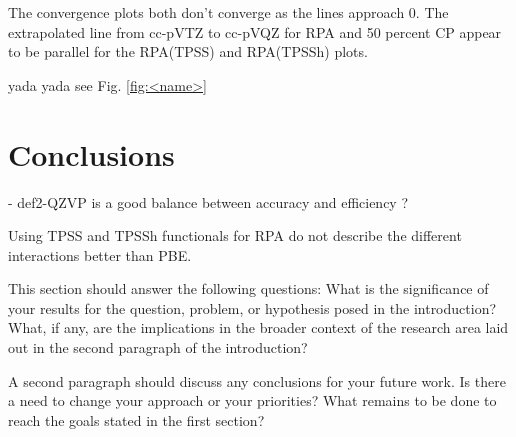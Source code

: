 \documentclass[11pt]{article}
\newcommand{\brian}[1]{{\color{orange} #1}}
\begin{document}
The convergence plots both don't converge as the lines approach 0. The
extrapolated line from cc-pVTZ to cc-pVQZ for RPA and 50 percent CP
appear to be parallel for the RPA(TPSS) and RPA(TPSSh) plots.

\brian{yada yada see Fig. \ref{fig:<name>}}




\section{Conclusions}

- def2-QZVP is a good balance between accuracy and efficiency ?

Using TPSS and TPSSh functionals for RPA do not describe the different
interactions better than PBE.


This section should answer the following questions:
What is the significance of your results for the question, problem, or
hypothesis posed in the introduction? What, if any, are the
implications in the broader context of the research area laid out in the
second paragraph of the introduction? 

A second paragraph should discuss any conclusions for your future work. 
Is there a need to change your approach or your priorities? What remains
to be done to reach the goals stated in the first section? 

\printbibliography
\end{document}
